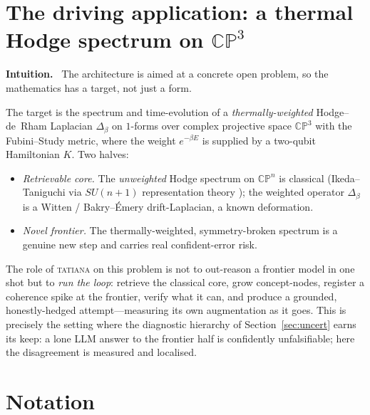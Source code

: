 \documentclass[11pt]{article}
\theoremstyle{definition}
\theoremstyle{plain}
\theoremstyle{remark}
\newcommand{\Intu}{\noindent\textbf{\color{intuitioncol}Intuition.}\ }
\begin{document}
\appendix
\section{The driving application: a thermal Hodge spectrum on \texorpdfstring{$\mathbb{CP}^3$}{CP3}}\label{app:cp3}

\begin{intu}\Intu
The architecture is aimed at a concrete open problem, so the mathematics has a target,
not just a form.
\end{intu}

The target is the spectrum and time-evolution of a \emph{thermally-weighted}
Hodge--de~Rham Laplacian $\Delta_\beta$ on $1$-forms over complex projective space
$\mathbb{CP}^3$ with the Fubini--Study metric, where the weight $e^{-\beta E}$ is
supplied by a two-qubit Hamiltonian $K$. Two halves:
\begin{itemize}[nosep]
  \item \emph{Retrievable core.} The \emph{unweighted} Hodge spectrum on
  $\mathbb{CP}^n$ is classical (Ikeda--Taniguchi via $SU(n{+}1)$ representation theory
  \cite{IkedaTaniguchi}); the weighted operator $\Delta_\beta$ is a Witten /
  Bakry--Émery drift-Laplacian, a known deformation.
  \item \emph{Novel frontier.} The thermally-weighted, symmetry-broken spectrum is a
  genuine new step and carries real confident-error risk.
\end{itemize}
The role of \textsc{tatiana} on this problem is not to out-reason a frontier model in
one shot but to \emph{run the loop}: retrieve the classical core, grow concept-nodes,
register a coherence spike at the frontier, verify what it can, and produce a grounded,
honestly-hedged attempt---measuring its own augmentation as it goes. This is precisely
the setting where the diagnostic hierarchy of Section~\ref{sec:uncert} earns its keep:
a lone LLM answer to the frontier half is confidently unfalsifiable; here the
disagreement is measured and localised.

\section{Notation}\label{app:notation}
\end{document}
